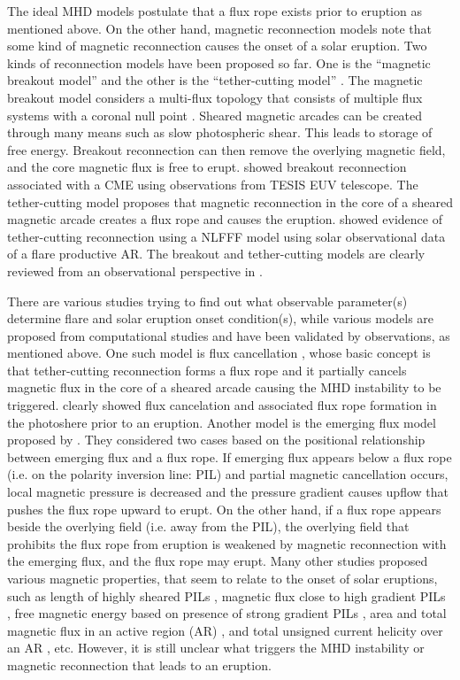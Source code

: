 \documentclass[10pt,preprint2]{aastex}
\begin{document}
The ideal MHD models postulate that a flux rope exists prior to eruption as mentioned above.
On the other hand, magnetic reconnection models note that some kind of magnetic reconnection causes the onset of a solar eruption.
Two kinds of reconnection models have been proposed so far.
One is the ``magnetic breakout model'' \citep{Antiochos99, karpen12} and the other is the ``tether-cutting model'' \citep{moore01, moore06}.
The magnetic breakout model considers a multi-flux topology that consists of multiple flux systems with a coronal null point \citep[e.g.][]{priest96, sun12}.
Sheared magnetic arcades can be created through many means such as slow photospheric shear. This leads to storage of free energy. Breakout reconnection can then remove the overlying magnetic field, and the core magnetic flux is free to erupt.
\citet{reva16} showed breakout reconnection associated with a CME using observations from TESIS EUV telescope.
The tether-cutting model proposes that magnetic reconnection in the core of a sheared magnetic arcade creates a flux rope and causes the eruption.
\citet{liu13} showed evidence of tether-cutting reconnection using a NLFFF model using solar observational data of a flare productive AR.
The breakout and tether-cutting models are clearly reviewed from an observational perspective in \citet{schmieder15}.

There are various studies trying to find out what observable parameter(s) determine flare and solar eruption onset condition(s), while various models are proposed from computational studies and have been validated by observations, as mentioned above.
One such model is flux cancellation \citep{vanBallegooijen89, aulanier10}, whose basic concept is that tether-cutting reconnection forms a flux rope and it partially cancels magnetic flux in the core of a sheared arcade causing the MHD instability to be triggered.
\citet{Green11} clearly showed flux cancelation and associated flux rope formation in the photoshere prior to an eruption.
Another model is the emerging flux model proposed by \citet{chenshibata00}.
They considered two cases based on the positional relationship between emerging flux and a flux rope.
If emerging flux appears below a flux rope (i.e. on the polarity inversion line: PIL) and partial magnetic cancellation occurs, local magnetic pressure is decreased and the pressure gradient causes upflow that pushes the flux rope upward to erupt.
On the other hand, if a flux rope appears beside the overlying field (i.e. away from the PIL), the overlying field that prohibits the flux rope from eruption is weakened by magnetic reconnection with the emerging flux, and the flux rope may erupt.
Many other studies proposed various magnetic properties, that seem to relate to the onset of solar eruptions, such as length of highly sheared PILs \citep{hagyard84b}, magnetic flux close to high gradient PILs \citep{schrijver07}, free magnetic energy based on presence of strong gradient PILs \citep{falconer08}, area and total magnetic flux in an active region (AR) \citep{higgins11}, and total unsigned current helicity over an AR \citep{bobra15}, etc.
However, it is still unclear what triggers the MHD instability or magnetic reconnection that leads to an eruption.
\end{document}
